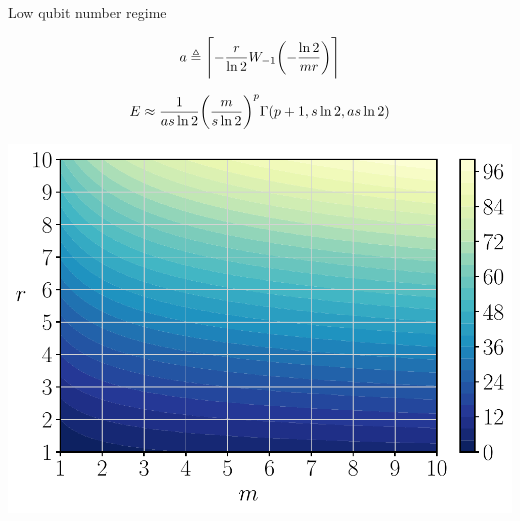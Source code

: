 \documentclass[9pt, handout, aspectratio=169]{beamer}	%
\begin{document}

\begin{frame}{Low qubit number regime}

	\begin{multicols}{2}

		\begin{gather*}
			a \defeq \ceil*{- \frac{r}{\ln{2}} W_{-1}\qty(-\frac{\ln{2}}{mr})}
		\end{gather*}

		\columnbreak

		\begin{gather*}
			E \approx \frac{1}{as\ln{2}} \qty(\frac{m}{s\ln{2}})^p
    		\Gamma \qty(p+1, s\ln{2}, as\ln{2}) \label{eq:QSR-efficiency}
		\end{gather*}

	\end{multicols}

	\vspace{-2em}
	\begin{multicols}{2}

		\begin{center}
			\includegraphics[width=.40\paperwidth]{Figures/threshold}
		\end{center}

		\columnbreak


\end{multicols}
\end{frame}
\end{document}
